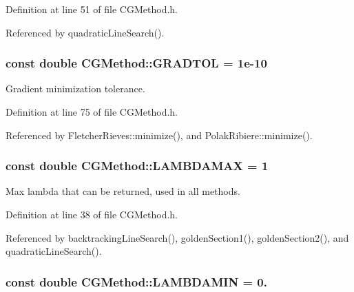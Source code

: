 Definition at line 51 of file C\+G\+Method.\+h.



Referenced by quadratic\+Line\+Search().

\hypertarget{classCGMethod_ad0118dc4da7526f196a4b4172bba9625}{
\subsubsection[{G\+R\+A\+D\+T\+O\+L}]{\setlength{\rightskip}{0pt plus 5cm}const double C\+G\+Method\+::\+G\+R\+A\+D\+T\+O\+L = 1e-\/10\hspace{0.3cm}{\ttfamily [protected]}}}\label{classCGMethod_ad0118dc4da7526f196a4b4172bba9625}


Gradient minimization tolerance. 



Definition at line 75 of file C\+G\+Method.\+h.



Referenced by Fletcher\+Rieves\+::minimize(), and Polak\+Ribiere\+::minimize().

\hypertarget{classCGMethod_a04127fd877e82fdf4f71cd3709581419}{
\subsubsection[{L\+A\+M\+B\+D\+A\+M\+A\+X}]{\setlength{\rightskip}{0pt plus 5cm}const double C\+G\+Method\+::\+L\+A\+M\+B\+D\+A\+M\+A\+X = 1\hspace{0.3cm}{\ttfamily [protected]}}}\label{classCGMethod_a04127fd877e82fdf4f71cd3709581419}


Max lambda that can be returned, used in all methods. 



Definition at line 38 of file C\+G\+Method.\+h.



Referenced by backtracking\+Line\+Search(), golden\+Section1(), golden\+Section2(), and quadratic\+Line\+Search().

\hypertarget{classCGMethod_ae28b20ab18f9a0b7c6a1c443add1026e}{
\subsubsection[{L\+A\+M\+B\+D\+A\+M\+I\+N}]{\setlength{\rightskip}{0pt plus 5cm}const double C\+G\+Method\+::\+L\+A\+M\+B\+D\+A\+M\+I\+N = 0.\hspace{0.3cm}{\ttfamily [protected]}}}\label{classCGMethod_ae28b20ab18f9a0b7c6a1c443add1026e}


